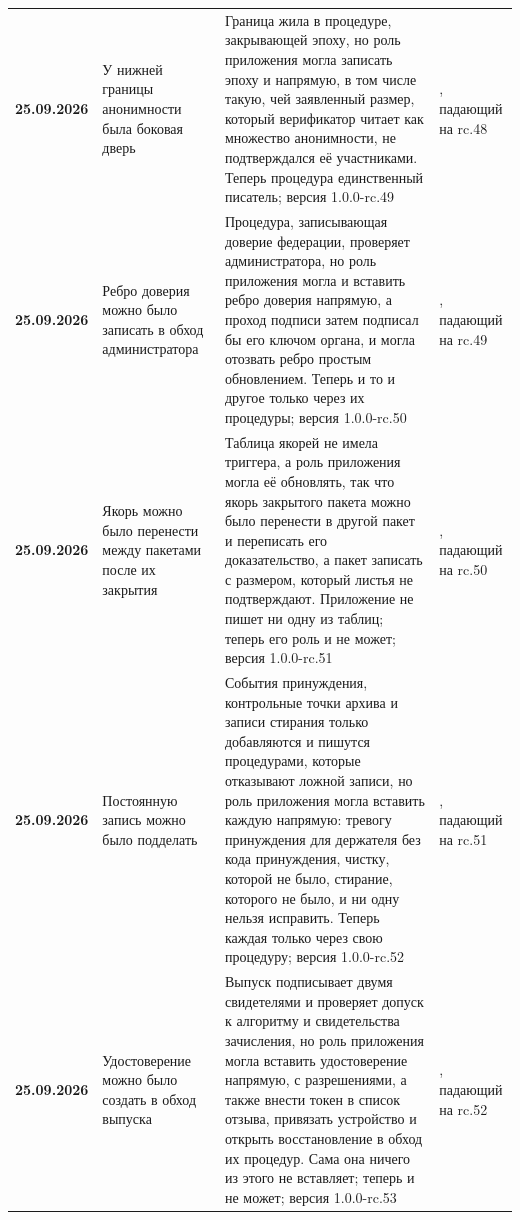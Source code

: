 {\begin{xltabular}{\textwidth}{>{\bfseries\hspace{0pt}}p{0.74in} >{\RaggedRight\arraybackslash\hspace{0pt}}X >{\RaggedRight\arraybackslash\hspace{0pt}}X >{\RaggedRight\arraybackslash\hspace{0pt}}p{1.6in}}
25.09.2026 & У нижней границы анонимности была боковая дверь & Граница жила в процедуре, закрывающей эпоху, но роль приложения могла записать эпоху и напрямую, в том числе такую, чей заявленный размер, который верификатор читает как множество анонимности, не подтверждался её участниками. Теперь процедура единственный писатель; версия 1.0.0-rc.49 & , падающий на rc.48 \\
25.09.2026 & Ребро доверия можно было записать в обход администратора & Процедура, записывающая доверие федерации, проверяет администратора, но роль приложения могла и вставить ребро доверия напрямую, а проход подписи затем подписал бы его ключом органа, и могла отозвать ребро простым обновлением. Теперь и то и другое только через их процедуры; версия 1.0.0-rc.50 & , падающий на rc.49 \\
25.09.2026 & Якорь можно было перенести между пакетами после их закрытия & Таблица якорей не имела триггера, а роль приложения могла её обновлять, так что якорь закрытого пакета можно было перенести в другой пакет и переписать его доказательство, а пакет записать с размером, который листья не подтверждают. Приложение не пишет ни одну из таблиц; теперь его роль и не может; версия 1.0.0-rc.51 & , падающий на rc.50 \\
25.09.2026 & Постоянную запись можно было подделать & События принуждения, контрольные точки архива и записи стирания только добавляются и пишутся процедурами, которые отказывают ложной записи, но роль приложения могла вставить каждую напрямую: тревогу принуждения для держателя без кода принуждения, чистку, которой не было, стирание, которого не было, и ни одну нельзя исправить. Теперь каждая только через свою процедуру; версия 1.0.0-rc.52 & , падающий на rc.51 \\
25.09.2026 & Удостоверение можно было создать в обход выпуска & Выпуск подписывает двумя свидетелями и проверяет допуск к алгоритму и свидетельства зачисления, но роль приложения могла вставить удостоверение напрямую, с разрешениями, а также внести токен в список отзыва, привязать устройство и открыть восстановление в обход их процедур. Сама она ничего из этого не вставляет; теперь и не может; версия 1.0.0-rc.53 & , падающий на rc.52 \\

\end{xltabular}}
